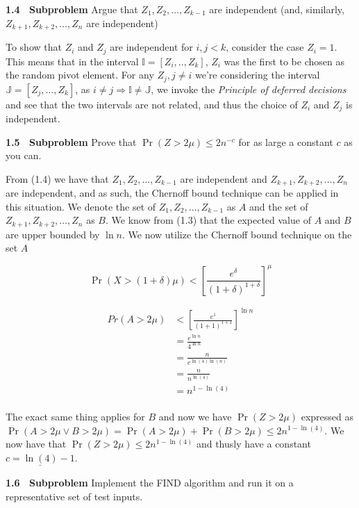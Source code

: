 \documentclass[article,a4paper,oneside]{article}
\newcommand{\+}[1]{\ensuremath{\boldsymbol{#1}}}
\begin{document}
{\bf 1.4 \ Subproblem} Argue that $Z_1,Z_2,\ldots,Z_{k-1}$ are independent 
(and, similarly, $Z_{k+1},Z_{k+2},\ldots,Z_n$  are independent)

To show that $Z_i$ and $Z_j$ are independent for $i,j < k$, consider the case $Z_i = 1$. This means that in the interval $\mathbb{I} = [Z_i,..,Z_k]$, $Z_i$ was the first to be chosen as the random pivot element.
For any $Z_j, j \neq i$ we're considering the interval $\mathbb{J} = [Z_j,\ldots, Z_k]$, as $i \neq j \Rightarrow \mathbb{I} \neq \mathbb{J}$, we invoke the \emph{Principle of deferred decisions} and see that the two intervals are not related, and thus the choice of $Z_i$ and $Z_j$ is independent.

{\bf 1.5 \ Subproblem}
Prove that $\Pr(Z>2\mu)\leq 2 n^{-c}$ for as
large a constant $c$ as you can.

From (1.4) we have that $Z_1, Z_2, \ldots, Z_{k-1}$ are independent and $Z_{k+1}, Z_{k+2}, \ldots, Z_n$ are independent, and as such, the Chernoff bound technique can be applied in this situation. We denote the set of $Z_1, Z_2, \ldots, Z_{k-1}$ as $A$ and the set of $Z_{k+1}, Z_{k+2}, \ldots, Z_n$ as $B$. We know from (1.3) that the expected value of $A$ and $B$ are upper bounded by $\ln n$. We now utilize the Chernoff bound technique on the set $A$

$$\Pr \left( X > (1+\delta)\mu \right) < \left[ \frac{e^\delta}{(1+\delta)^{1+\delta}} \right]^\mu$$

\begin{align*}
  Pr( A > 2\mu) & <  \left[ \frac{e^1}{(1+1)^{1+1}} \right] ^{\ln n} \\
  &= \frac{e^{\ln n}}{4^{\ln n}}\\ 
  &= \frac {n}{e^{\ln(4)\ln(n)}} \\
  &= \frac{n}{n^{\ln(4)}}\\
  &= n^{1-\ln (4)}\\
\end{align*}

The exact same thing applies for $B$ and now we have $\Pr ( Z > 2\mu)$ expressed as $ \Pr ( A > 2\mu \vee B > 2\mu) = \Pr ( A > 2\mu) + \Pr( B > 2\mu) \leq 2n^{1-\ln(4)}$. We now have that $\Pr ( Z > 2\mu) \leq 2n^{1-\ln(4)}$ and thusly have a constant $\underline{c=\ln(4)-1}$.

{\bf 1.6 \ Subproblem} Implement the FIND algorithm and run it on a
representative set of test inputs. 

\end{document}
